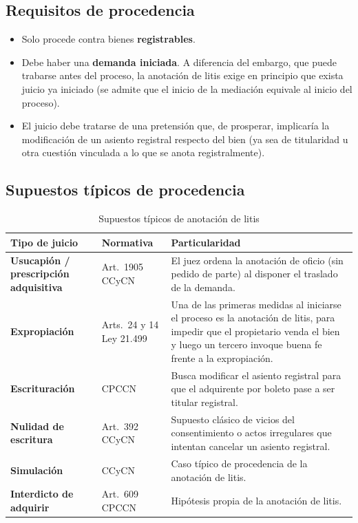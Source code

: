 \documentclass[12pt,oneside]{book}
\begin{document}
\subsection{Requisitos de procedencia}

\begin{itemize}
    \item Solo procede contra bienes \textbf{registrables}.
    \item Debe haber una \textbf{demanda iniciada}. A diferencia del embargo, que puede trabarse antes del proceso, la anotación de litis exige en principio que exista juicio ya iniciado (se admite que el inicio de la mediación equivale al inicio del proceso).
    \item El juicio debe tratarse de una pretensión que, de prosperar, implicaría la modificación de un asiento registral respecto del bien (ya sea de titularidad u otra cuestión vinculada a lo que se anota registralmente).
\end{itemize}

\subsection{Supuestos típicos de procedencia}

\begin{table}[H]
\centering
\small
\begin{tabularx}{\textwidth}{>{\raggedright\arraybackslash}p{3.2cm} >{\raggedright\arraybackslash}p{3.0cm} >{\raggedright\arraybackslash}X}
\toprule
\textbf{Tipo de juicio} & \textbf{Normativa} & \textbf{Particularidad} \\
\midrule
\textbf{Usucapión / prescripción adquisitiva} & Art.\ 1905 CCyCN & El juez ordena la anotación de oficio (sin pedido de parte) al disponer el traslado de la demanda. \\
\addlinespace
\textbf{Expropiación} & Arts.\ 24 y 14 Ley 21.499 & Una de las primeras medidas al iniciarse el proceso es la anotación de litis, para impedir que el propietario venda el bien y luego un tercero invoque buena fe frente a la expropiación. \\
\addlinespace
\textbf{Escrituración} & CPCCN & Busca modificar el asiento registral para que el adquirente por boleto pase a ser titular registral. \\
\addlinespace
\textbf{Nulidad de escritura} & Art.\ 392 CCyCN & Supuesto clásico de vicios del consentimiento o actos irregulares que intentan cancelar un asiento registral. \\
\addlinespace
\textbf{Simulación} & CCyCN & Caso típico de procedencia de la anotación de litis. \\
\addlinespace
\textbf{Interdicto de adquirir} & Art.\ 609 CPCCN & Hipótesis propia de la anotación de litis. \\
\bottomrule
\end{tabularx}
\caption{Supuestos típicos de anotación de litis}
\end{table}
\end{document}
